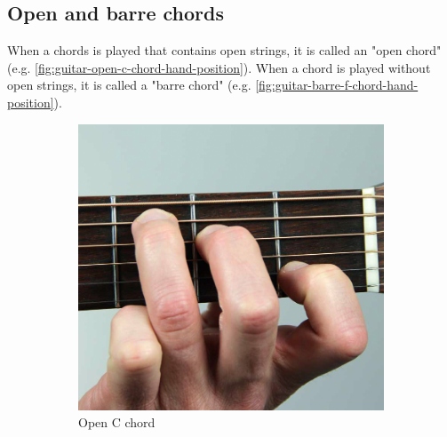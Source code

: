 \newpage

\subsection{Open and barre chords}

When a chords is played that contains open strings, it is called an "open chord" (e.g. \autoref{fig:guitar-open-c-chord-hand-position}). When a chord is played without open strings, it is called a "barre chord" (e.g. \autoref{fig:guitar-barre-f-chord-hand-position}).

\begin{figure}[h]
	\begin{subfigure}[b]{0.45\textwidth}
		\includegraphics[width=\textwidth]{../../Images/open-c-chord.jpg}
		\caption{Open C chord \cite{OpenCChordHand}}
		\label{fig:guitar-open-c-chord-hand-position}
	\end{subfigure}
	\hfill
	\begin{subfigure}[b]{0.45\textwidth}

\end{subfigure}
\end{figure}
